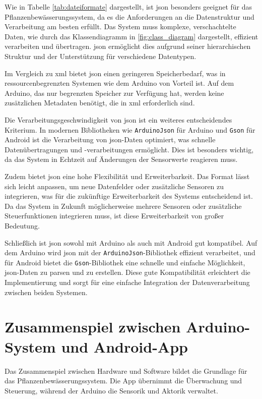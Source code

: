 Wie in Tabelle \ref{tab:dateiformate} dargestellt, ist \ac{json} besonders geeignet für das Pflanzenbewässerungssystem, da es die Anforderungen an die Datenstruktur und Verarbeitung am besten erfüllt. Das System muss komplexe, verschachtelte Daten, wie durch das Klassendiagramm in \autoref{fig:class_diagram} dargestellt, effizient verarbeiten und übertragen. \ac{json} ermöglicht dies aufgrund seiner hierarchischen Struktur und der Unterstützung für verschiedene Datentypen. 

Im Vergleich zu \ac{xml} bietet \ac{json} einen geringeren Speicherbedarf, was in ressourcenbegrenzten Systemen wie dem Arduino von Vorteil ist. Auf dem Arduino, das nur begrenzten Speicher zur Verfügung hat, werden keine zusätzlichen Metadaten benötigt, die in \ac{xml} erforderlich sind. 

Die Verarbeitungs­geschwindigkeit von \ac{json} ist ein weiteres entscheidendes Kriterium. In modernen Bibliotheken wie \texttt{ArduinoJson} für Arduino und \texttt{Gson} für Android ist die Verarbeitung von \ac{json}-Daten optimiert, was schnelle Datenübertragungen und -verarbeitungen ermöglicht. Dies ist besonders wichtig, da das System in Echtzeit auf Änderungen der Sensorwerte reagieren muss. 

Zudem bietet \ac{json} eine hohe Flexibilität und Erweiterbarkeit. Das Format lässt sich leicht anpassen, um neue Datenfelder oder zusätzliche Sensoren zu integrieren, was für die zukünftige Erweiterbarkeit des Systems entscheidend ist. Da das System in Zukunft möglicherweise mehrere Sensoren oder zusätzliche Steuerfunktionen integrieren muss, ist diese Erweiterbarkeit von großer Bedeutung.

Schließlich ist \ac{json} sowohl mit Arduino als auch mit Android gut kompatibel. Auf dem Arduino wird \ac{json} mit der \texttt{ArduinoJson}-Bibliothek effizient verarbeitet, und für Android bietet die \texttt{Gson}-Bibliothek eine schnelle und einfache Möglichkeit, \ac{json}-Daten zu parsen und zu erstellen. Diese gute Kompatibilität erleichtert die Implementierung und sorgt für eine einfache Integration der Datenverarbeitung zwischen beiden Systemen.

\section{Zusammenspiel zwischen Arduino-System und Android-App}
Das Zusammenspiel zwischen Hardware und Software bildet die Grundlage für das Pflanzenbewässerungssystem. Die App übernimmt die Überwachung und Steuerung, während der Arduino die Sensorik und Aktorik verwaltet. 

